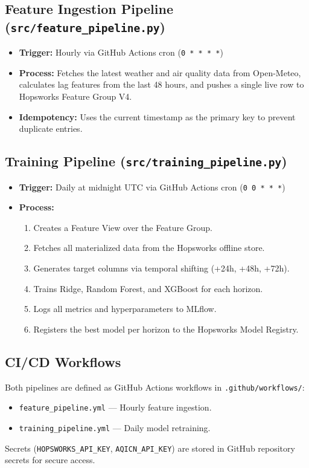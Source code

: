 \documentclass[11pt,a4paper]{article}
\begin{document}
\subsection{Feature Ingestion Pipeline (\texttt{src/feature\_pipeline.py})}
\begin{itemize}
    \item \textbf{Trigger:} Hourly via GitHub Actions cron (\texttt{0 * * * *})
    \item \textbf{Process:} Fetches the latest weather and air quality data from Open-Meteo, calculates lag features from the last 48 hours, and pushes a single live row to Hopsworks Feature Group V4.
    \item \textbf{Idempotency:} Uses the current timestamp as the primary key to prevent duplicate entries.
\end{itemize}

\subsection{Training Pipeline (\texttt{src/training\_pipeline.py})}
\begin{itemize}
    \item \textbf{Trigger:} Daily at midnight UTC via GitHub Actions cron (\texttt{0 0 * * *})
    \item \textbf{Process:}
    \begin{enumerate}
        \item Creates a Feature View over the Feature Group.
        \item Fetches all materialized data from the Hopsworks offline store.
        \item Generates target columns via temporal shifting (+24h, +48h, +72h).
        \item Trains Ridge, Random Forest, and XGBoost for each horizon.
        \item Logs all metrics and hyperparameters to MLflow.
        \item Registers the best model per horizon to the Hopsworks Model Registry.
    \end{enumerate}
\end{itemize}

\subsection{CI/CD Workflows}
Both pipelines are defined as GitHub Actions workflows in \texttt{.github/workflows/}:
\begin{itemize}
    \item \texttt{feature\_pipeline.yml} --- Hourly feature ingestion.
    \item \texttt{training\_pipeline.yml} --- Daily model retraining.
\end{itemize}
Secrets (\texttt{HOPSWORKS\_API\_KEY}, \texttt{AQICN\_API\_KEY}) are stored in GitHub repository secrets for secure access.
\end{document}
